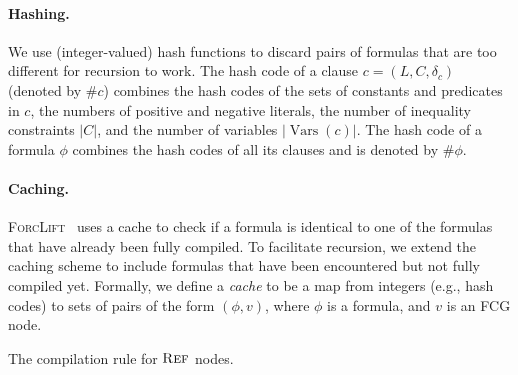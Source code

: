 \documentclass{article}
\theoremstyle{definition}
\DeclareMathOperator{\Reff}{\textsc{Ref}}
\DeclareMathOperator{\Vars}{Vars}
\begin{document}
\paragraph{Hashing.}
We use (integer-valued) hash functions to discard pairs of formulas that are too
different for recursion to work. The hash code of a clause
$c = (L, C, \delta_{c})$ (denoted by $\# c$) combines the hash codes of the sets
of constants and predicates in $c$, the numbers of positive and negative
literals, the number of inequality constraints $|C|$, and the number of
variables $|\Vars(c)|$. The hash code of a formula $\phi$ combines the hash
codes of all its clauses and is denoted by $\#\phi$.

\paragraph{Caching.}
\textsc{ForcLift}~\cite{DBLP:conf/ijcai/BroeckTMDR11} uses a cache to check if
a formula is identical to one of the formulas that have already been fully
compiled. To facilitate recursion, we extend the caching scheme to include
formulas that have been encountered but not fully compiled yet. Formally, we
define a \emph{cache} to be a map from integers (e.g., hash codes) to sets of
pairs of the form $(\phi, v)$, where $\phi$ is a formula, and $v$ is an FCG
node.

\begin{algorithm}[t]
  \caption{The compilation rule for $\Reff$ nodes.}\label{alg:trycache}

  \ForEach{formula and node $(\psi, v) \in C(\#\phi)$}{
    $\rho \gets \identifyRecursion{$\phi$, $\psi$}$\;
    \lIf{$\rho \ne {\normalfont \texttt{null}}$}{\Return{$\{\, (\Reff_\rho(v), \langle\rangle) \,\}$}}
  }
  \Return{$\emptyset$}\;

\end{algorithm}
\end{document}
